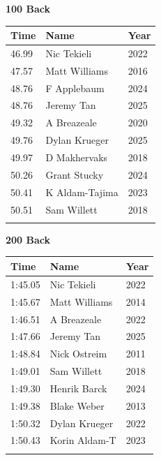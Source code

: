 \vspace{1.2em}
\noindent\begin{minipage}[t]{0.48\textwidth}
\centering
\textbf{\textcolor{teamprimary}{100 Back}}\par
\vspace{0.5em}
\centering
\small
\renewcommand{\arraystretch}{1.0}
\setlength{\tabcolsep}{4pt}
\begin{tabular}{@{}p{1.8cm}p{3.0cm}p{1.0cm}@{}}
\toprule
\textbf{Time} & \textbf{Name} & \textbf{Year} \\
\midrule
46.99 & Nic Tekieli & 2022 \\
47.57 & Matt Williams & 2016 \\
48.76 & F Applebaum & 2024 \\
48.76 & Jeremy Tan & 2025 \\
49.32 & A Breazeale & 2020 \\
49.76 & Dylan Krueger & 2025 \\
49.97 & D Makhervaks & 2018 \\
50.26 & Grant Stucky & 2024 \\
50.41 & K Aldam-Tajima & 2023 \\
50.51 & Sam Willett & 2018 \\
\bottomrule
\vspace{0.5em}
\end{tabular}
\end{minipage}
\hfill
\begin{minipage}[t]{0.48\textwidth}
\centering
\textbf{\textcolor{teamprimary}{200 Back}}\par
\vspace{0.5em}
\centering
\small
\renewcommand{\arraystretch}{1.0}
\setlength{\tabcolsep}{4pt}
\begin{tabular}{@{}p{1.8cm}p{3.0cm}p{1.0cm}@{}}
\toprule
\textbf{Time} & \textbf{Name} & \textbf{Year} \\
\midrule
1:45.05 & Nic Tekieli & 2022 \\
1:45.67 & Matt Williams & 2014 \\
1:46.51 & A Breazeale & 2022 \\
1:47.66 & Jeremy Tan & 2025 \\
1:48.84 & Nick Ostreim & 2011 \\
1:49.01 & Sam Willett & 2018 \\
1:49.30 & Henrik Barck & 2024 \\
1:49.38 & Blake Weber & 2013 \\
1:50.32 & Dylan Krueger & 2022 \\
1:50.43 & Korin Aldam-T & 2023 \\
\bottomrule
\vspace{0.5em}
\end{tabular}
\end{minipage}
